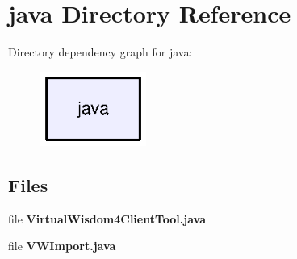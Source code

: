 \section{java Directory Reference}
\label{dir_93c6ba7fb77bae0709fae89c9c13b44a}
Directory dependency graph for java\-:\nopagebreak
\begin{figure}[H]
\begin{center}
\leavevmode
\includegraphics[width=98pt]{dir_93c6ba7fb77bae0709fae89c9c13b44a_dep}
\end{center}
\end{figure}
\subsection*{Files}
\begin{DoxyCompactItemize}
\item 
file {\bfseries Virtual\-Wisdom4\-Client\-Tool.\-java}
\item 
file {\bf V\-W\-Import.\-java}
\end{DoxyCompactItemize}
